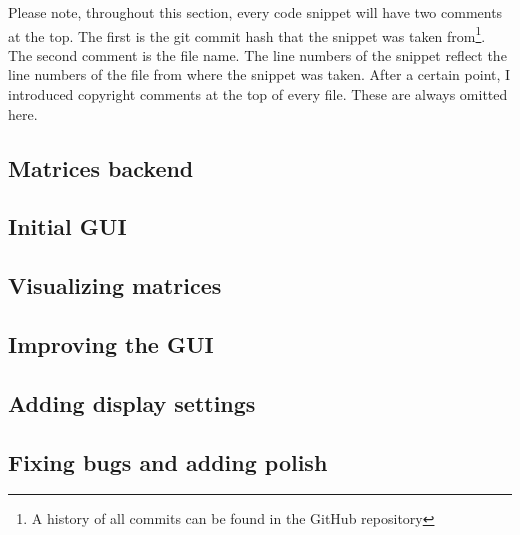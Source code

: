 \documentclass[../main.tex]{subfiles}
\begin{document}
Please note, throughout this section, every code snippet will have two comments at the top. The first is the git commit hash that the snippet was taken from\footnote{A history of all commits can be found in the GitHub repository\cite{lintrans-github}}. The second comment is the file name. The line numbers of the snippet reflect the line numbers of the file from where the snippet was taken. After a certain point, I introduced copyright comments at the top of every file. These are always omitted here.

\subsection{Matrices backend\label{development:matrices-backend}}


\subsection{Initial GUI\label{development:initial-gui}}


\subsection{Visualizing matrices\label{development:visualizing-matrices}}


\subsection{Improving the GUI\label{development:improving-the-gui}}


\subsection{Adding display settings\label{development:adding-display-settings}}


\subsection{Fixing bugs and adding polish\label{development:fixing-bugs-and-adding-polish}}

\end{document}
